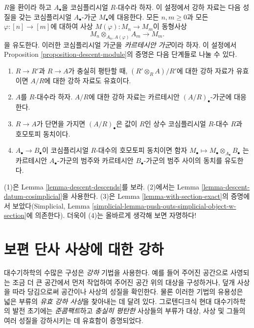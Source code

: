 \begin{remark}
\label{remark-homotopy-equivalent-cosimplicial-algebras}
$R$을 환이라 하고 $A_\bullet$을 코심플리시얼 $R$-대수라 하자.
이 설정에서 강하 자료는 다음 성질을 갖는 코심플리시얼 $A_\bullet$-가군
$M_\bullet$에 대응한다. 모든 $n, m \geq 0$과 모든
$\varphi : [n] \to [m]$에 대하여 사상 $M(\varphi) : M_n \to M_m$이
동형사상
$$
M_n \otimes_{A_n, A(\varphi)} A_m \longrightarrow M_m.
$$
을 유도한다. 이러한 코심플리시얼 가군을 {\it 카르테시안 가군}이라 하자.
이 설정에서 Proposition \ref{proposition-descent-module}의 증명은 다음
단계들로 나눌 수 있다.
\begin{enumerate}
\item $R \to R'$과 $R \to A$가 충실히 평탄할 때,
$(R' \otimes_R A)/R'$에 대한 강하 자료가 유효이면 $A/R$에 대한 강하
자료도 유효이다.
\item $A$를 $R$-대수라 하자. $A/R$에 대한 강하 자료는 카르테시안
$(A/R)_\bullet$-가군에 대응한다.
\item $R \to A$가 단면을 가지면 $(A/R)_\bullet$은 값이 $R$인 상수
코심플리시얼 $R$-대수 $R$과 호모토피 동치이다.
\item $A_\bullet \to B_\bullet$이 코심플리시얼 $R$-대수의 호모토피
동치이면 함자
$M_\bullet \mapsto M_\bullet \otimes_{A_\bullet} B_\bullet$
는 카르테시안 $A_\bullet$-가군의 범주와 카르테시안 $B_\bullet$-가군의
범주 사이의 동치를 유도한다.
\end{enumerate}
(1)은 Lemma \ref{lemma-descent-descends}를 보라. (2)에서는 Lemma
\ref{lemma-descent-datum-cosimplicial}을 사용한다. (3)은 Lemma
\ref{lemma-with-section-exact}의 증명에서 보았다(Simplicial, Lemma
\ref{simplicial-lemma-push-outs-simplicial-object-w-section}에 의존한다).
더욱이 (4)는 올바르게 생각해 보면 자명하다!
\end{remark}








\section{보편 단사 사상에 대한 강하}
\label{section-descent-universally-injective}

\noindent
대수기하학의 수많은 구성은 {\it 강하} 기법을 사용한다. 예를 들어 주어진
공간으로 사영되는 조금 더 큰 공간에서 먼저 작업하여 주어진 공간 위의
대상을 구성하거나, 덮개 사상을 따라 당김으로써 공간이나 사상의 성질을
확인한다. 물론 이러한 기법의 유용성은 넓은 부류의 {\it 유효 강하 사상}을
찾아내는 데 달려 있다. 그로텐디크식 현대 대수기하학의 발전 초기에는
{\it 준콤팩트}하고 {\it 충실히 평탄한} 사상들의 부류가 대상, 사상 및
그들의 여러 성질을 강하시키는 데 유효함이 증명되었다.

